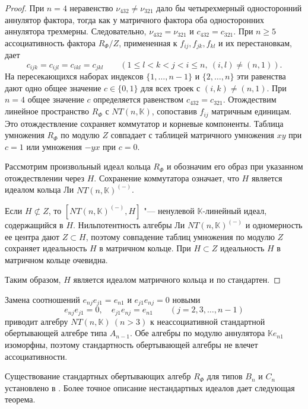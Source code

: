 \documentclass[a4paper,14pt,oneside,openany]{memoir}
\begin{document}
\begin{proof}
    При $n=4$ неравенство $\nu_{432}\neq\nu_{321}$ дало бы четырехмерный
    односторонний аннулятор фактора, тогда как у матричного фактора оба
    односторонних аннулятора трехмерны. Следовательно, $\nu_{432}=\nu_{321}$ и
    $c_{432}=c_{321}$. При $n\geq5$ ассоциативность фактора $R_\Phi/Z$, примененная
    к $f_{ij},f_{jk},f_{kl}$ и их перестановкам, дает
    \[
        c_{ijk}=c_{ijl}=c_{ikl}=c_{jkl}\qquad
        (1\leq l<k<j<i\leq n,\ (i,l)\neq(n,1)).
    \]
    На пересекающихся наборах индексов $\{1,\ldots,n-1\}$ и $\{2,\ldots,n\}$ эти
    равенства дают одно общее значение $c\in\{0,1\}$ для всех троек с
    $(i,k)\neq(n,1)$. При $n=4$ общее значение $c$ определяется равенством
    $c_{432}=c_{321}$. Отождествим линейное пространство $R_\Phi$ с
    $NT(n,\mathbb{K})$, сопоставив $f_{ij}$ матричным единицам. Это отождествление
    сохраняет коммутатор и корневые компоненты. Таблица умножения $R_\Phi$ по
    модулю $Z$ совпадает с таблицей матричного умножения $xy$ при $c=1$ или
    умножения $-yx$ при $c=0$.

    Рассмотрим произвольный идеал кольца $R_\Phi$ и обозначим его образ при
    указанном отождествлении через $H$. Сохранение коммутатора означает, что $H$
    является идеалом кольца Ли $NT(n,\mathbb{K})^{(-)}$.

    Если $H\not\subset Z$, то $[NT(n,\mathbb{K})^{(-)},H]$ "--- ненулевой
    $\mathbb{K}$-линейный идеал, содержащийся в $H$. Нильпотентность алгебры Ли
    $NT(n,\mathbb{K})^{(-)}$ и одномерность ее центра дают $Z\subset H$, поэтому
    совпадение таблиц умножения по модулю $Z$ сохраняет идеальность $H$ в матричном
    кольце. При $H\subset Z$ идеальность $H$ в матричном кольце очевидна.

    Таким образом, $H$ является идеалом матричного кольца и по
    \cite[следствие~4.2]{vL74} стандартен.
\end{proof}

\begin{remark}\label{remark:Stand-Non-Assoc-An}
    Замена соотношений $e_{nj}e_{j1}= e_{n1}$ и $e_{j1}e_{nj}=0$ новыми
    \[
        e_{nj}e_{j1}=0,\quad e_{j1}e_{nj}=e_{n1}\qquad (j=2,3,\ldots,n-1)
    \]
    приводит алгебру $NT(n,\mathbb{K})\ (n>3)$ к неассоциативной стандартной
    обертывающей алгебре типа $A_{n-1}$. Обе алгебры по модулю аннулятора
    $\mathbb{K}e_{n1}$ изоморфны, поэтому стандартность обертывающей алгебры не
    влечет ассоциативности.
\end{remark}

Существование стандартных обертывающих алгебр $R_{\Phi}$ для типов $B_n$ и
$C_n$ установлено в \cite[теорема~2]{imm2020}. Более точное описание
нестандартных идеалов дает следующая теорема.
\end{document}
